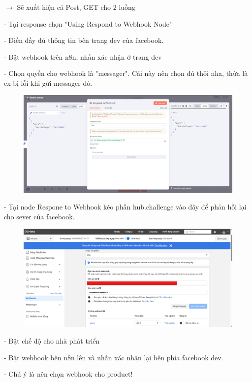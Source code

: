 $\rightarrow$ Sẽ xuất hiện cả Post, GET cho 2 luồng

- Tại response chọn "Using Respond to Webhook Node"

- Điền đầy đủ thông tin bên trang dev của facebook.

- Bật webhook trên n8n, nhấn xác nhận ở trang dev

- Chọn quyền cho webhook là "messager". Cái này nên chọn đủ thôi nha, thừa là cx bị lỗi khi gửi messager đó.

\begin{figure}[htbp]
    \centering
    \includegraphics[width=1\linewidth]{Chap1-7/webhook2.pdf}
\end{figure}

- Tại node Respone to Webhook kéo phần hub.challenge vào đây để phản hồi lại cho sever của facebook.


\begin{figure}[htbp]
    \centering
    \includegraphics[width=1\linewidth]{Chap1-7/webhook-fb.pdf}
\end{figure}

- Bật chế độ cho nhà phát triển

- Bật webhook bên n8n lên và nhấn xác nhận lại bên phía facebook dev.

- Chú ý là nên chọn webhook cho product!
\newpage

